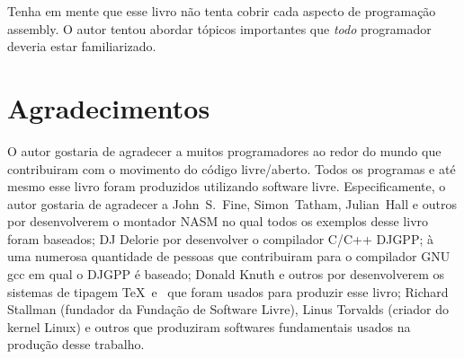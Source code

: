 Tenha em mente que esse livro não tenta cobrir cada aspecto de programação
assembly. O autor tentou abordar tópicos importantes que \emph{todo} programador
deveria estar familiarizado.

\section*{Agradecimentos}

O autor gostaria de agradecer a muitos programadores ao redor do mundo
que contribuiram com o movimento do código livre/aberto. Todos os programas
e até mesmo esse livro foram produzidos utilizando software livre. Especificamente,
o autor gostaria de agradecer a John~S.~Fine, Simon~Tatham, Julian~Hall e outros por
desenvolverem o montador NASM no qual todos os exemplos desse livro foram baseados;
DJ Delorie por desenvolver o compilador C/C++ DJGPP; à uma numerosa quantidade de
pessoas que contribuiram para o compilador GNU gcc em qual o DJGPP é baseado; 
Donald Knuth e outros por desenvolverem os sistemas de tipagem \TeX\ e \LaTeXe\ que
foram usados para produzir esse livro; Richard Stallman (fundador da Fundação de
Software Livre), Linus Torvalds (criador do kernel Linux) e outros
que produziram softwares fundamentais usados na produção desse trabalho.


